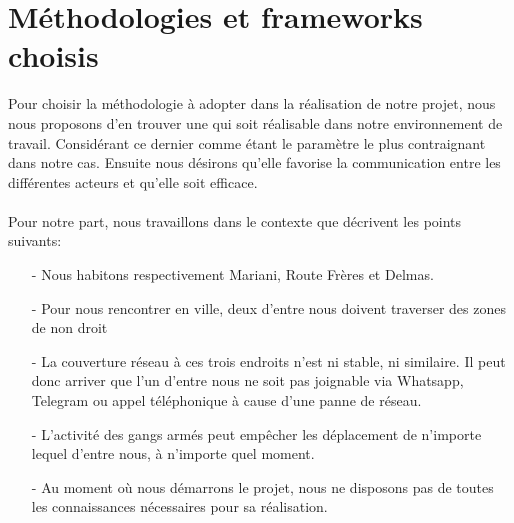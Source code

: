 	\section{M\'ethodologies et frameworks choisis}
		Pour choisir la m\'ethodologie \`a adopter dans la r\'ealisation de notre projet, nous nous proposons d'en trouver une qui soit r\'ealisable dans notre environnement de travail. Consid\'erant ce dernier comme \'etant le param\`etre le plus contraignant dans notre cas. Ensuite nous d\'esirons qu'elle favorise la communication entre les diff\'erentes acteurs et qu'elle soit efficace.

		\paragraph{} Pour notre part, nous travaillons dans le contexte que d\'ecrivent les points suivants:
			\begin{itemize}
				\item[-] Nous habitons respectivement Mariani, Route Fr\`eres et Delmas.
				\item[-] Pour nous rencontrer en ville, deux d'entre nous doivent traverser des zones de non droit
				\item[-] La couverture r\'eseau \`a ces trois endroits n'est ni stable, ni similaire. Il peut donc arriver que l'un d'entre nous ne soit pas joignable via Whatsapp, Telegram ou appel t\'el\'ephonique \`a cause d'une panne de r\'eseau.
				\item[-] L'activit\'e des gangs arm\'es peut emp\^echer les d\'eplacement de n'importe lequel d'entre nous, \`a n'importe quel moment.
				\item[-] Au moment o\`u nous d\'emarrons le projet, nous ne disposons pas de toutes les connaissances n\'ecessaires pour sa r\'ealisation.
			\end{itemize}


